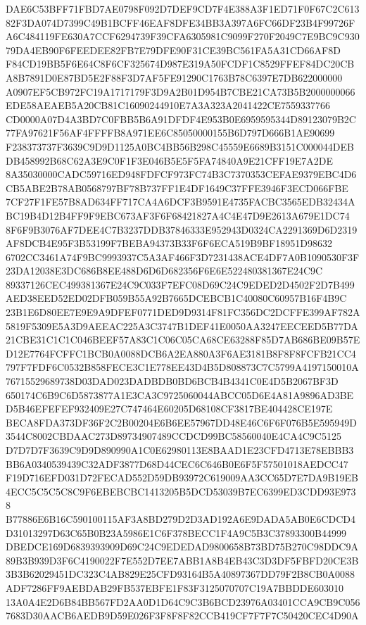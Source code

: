 \documentclass[UTF8,fontset=fandol,zihao=-4,a4paper]{ctexart}
\begin{document}
{{DAE6C53BFF71FBD7AE0798F092D7DEF9CD7F4E388A3F1ED71F0F67C2C61382F3DA074D7399C49B1BCFF46EAF8DFE34BB3A397A6FC66DF23B4F99726F
A6C484119FE630A7CCF6294739F39CFA6305981C9099F270F2049C7E9BC9C93079DA4EB90F6FEEDEE82FB7E79DFE90F31CE39BC561FA5A31CD66AF8D
F84CD19BB5F6E64C8F6CF325674D987E319A50FCDF1C8529FFEF84DC20CBA8B7891D0E87BD5E2F88F3D7AF5FE91290C1763B78C6397E7DB622000000
A0907EF5CB972FC19A1717179F3D9A2B01D954B7CBE21CA73B5B2000000066EDE58AEAEB5A20CB81C16090244910E7A3A323A2041422CE7559337766
CD0000A07D4A3BD7C0FBB5B6A91DFDF4E953B0E6959595344D89123079B2C77FA97621F56AF4FFFFB8A971EE6C85050000155B6D797D666B1AE90699
F238373737F3639C9D9D1125A0BC4BB56B298C45559E6689B3151C000044DEBDB458992B68C62A3E9C0F1F3E046B5E5F5FA74840A9E21CFF19E7A2DE
8A35030000CADC59716ED948FDFCF973FC74B3C7370353CEFAE9379EBC4D6CB5ABE2B78AB0568797BF78B737FF1E4DF1649C37FFE3946F3ECD066FBE
7CF27F1FE57B8AD634FF717CA4A6DCF3B9591E4735FACBC3565EDB32434ABC19B4D12B4FF9F9EBC673AF3F6F68421827A4C4E47D9E2613A679E1DC74
8F6F9B3076AF7DEE4C7B3237DDB37846333E952943D0324CA2291369D6D2319AF8DCB4E95F3B53199F7BEBA94373B33F6F6ECA519B9BF18951D98632
6702CC3461A74F9BC9993937C5A3AF466F3D7231438ACE4DF7A0B1090530F3F23DA12038E3DC686B8EE488D6D6D682356F6E6E522480381367E24C9C
89337126CEC499381367E24C9C033F7EFC08D69C24C9EDED2D4502F2D7B499AED38EED52ED02DFB059B55A92B7665DCEBCB1C40080C60957B16F4B9C
23B1E6D80EE7E9E9A9DFEF0771DED9D9314F81FC356DC2DCFFE399AF782A5819F5309E5A3D9AEEAC225A3C3747B1DEF41E0050AA3247EECEED5B77DA
21CBE31C1C1C046BEEF57A83C1C06C05CA68CE63288F85D7AB686BE09B57ED12E7764FCFFC1BCB0A0088DCB6A2EA880A3F6AE3181B8F8F8FCFB21CC4
797F7FDF6C0532B858FECE3C1E778EE43D4B5D808873C7C5799A4197150010A76715529689738D03DAD023DADBDB0BD6BCB4B4341C0E4D5B2067BF3D
650174C6B9C6D5873877A1E3CA3C9725060044ABCC05D6E4A81A9896AD3BED5B46EFEFEF932409E27C747464E60205D68108CF3817BE404428CE197E
BECA8FDA373DF36F2C2B00204E6B6EE57967DD48E46C6F6F076B5E595949D3544C8002CBDAAC273D89734907489CCDCD99BC58560040E4CA4C9C5125
D7D7D7F3639C9D9D890990A1C0E62980113E8BAAD1E23CFD4713E78EBBB3BB6A0340539439C32ADF3877D68D44CEC6C646B0E6F5F57501018AEDCC47
F19D716EFD031D72FECAD552D59DB93972C619009AA3CC65D7E7DA9B19EB4ECC5C5C5C8C9F6EBEBCBC1413205B5DCD53039B7EC6399ED3CDD93E9738
B77886E6B16C590100115AF3A8BD279D2D3AD192A6E9DADA5AB0E6CDCD4D31013297D63C65B0B23A5986E1C6F378BECC1F4A9C5B3C37893300B44999
DBEDCE169D6839393909D69C24C9EDEDAD9800658B73BD75B270C98DDC9A89B3B939D3F6C4190022F7E552D7EE7ABB1A8B4EB43C3D3DF5FBFD20CE3B
3B3B62029451DC323C4AB829E25CFD93164B5A40897367DD79F2B8CB0A0088ADF7286FF9AEBDAB29FB537EBFE1F83F3125070707C19A7BBDDE603010
13A0A4E2D6B84BB567FD2AA0D1D64C9C3B6BCD23976A03401CCA9CB9C0567683D30AACB6AEDB9D59E026F3F8F8F82CCB419CF7F7F7C50420CEC4D90A
}}
\end{document}
